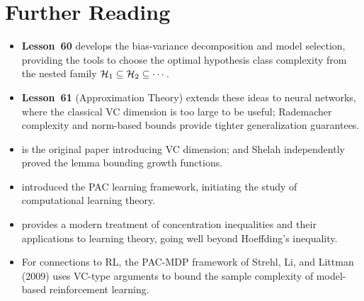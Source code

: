\documentclass[11pt,a4paper]{article}
\begin{document}
\section{Further Reading}
\label{sec:further_reading}

\begin{itemize}
    \item \textbf{Lesson~60} develops the bias-variance decomposition
    and model selection, providing the tools to choose the optimal
    hypothesis class complexity from the nested family
    $\mathcal{H}_1 \subseteq \mathcal{H}_2 \subseteq \cdots$.
    \item \textbf{Lesson~61} (Approximation Theory) extends these
    ideas to neural networks, where the classical VC dimension is
    too large to be useful; Rademacher complexity and norm-based
    bounds provide tighter generalization guarantees.
    \item \citet{vapnik1971} is the original paper introducing VC
    dimension; \citet{sauer1972} and Shelah independently proved
    the lemma bounding growth functions.
    \item \citet{valiant1984} introduced the PAC learning framework,
    initiating the study of computational learning theory.
    \item \citet{boucheron2013} provides a modern treatment of
    concentration inequalities and their applications to learning
    theory, going well beyond Hoeffding's inequality.
    \item For connections to RL, the PAC-MDP framework of Strehl,
    Li, and Littman (2009) uses VC-type arguments to bound the
    sample complexity of model-based reinforcement learning.
\end{itemize}


\end{document}
